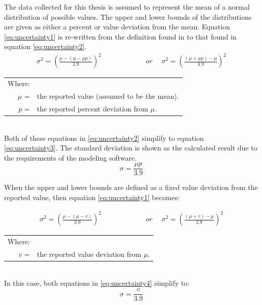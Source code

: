 \begin{linenumbers}
The data collected for this thesis is assumed to represent the mean of a normal distribution of possible values.  The upper and lower bounds of the distributions are given as either a percent or value deviation from the mean.  Equation \ref{eq:uncertainty1} is re-written from the definition found in \textcite{harmel2007} to that found in equation \ref{eq:uncertainty2}.
\begin{align}
	\sigma^2 = \left( \frac{\mu - (\mu - \mu p)}{3.9} \right)^2  &  \phantom{wordsssssss} or \phantom{s}  & 	\sigma^2 = \left( \frac{(\mu + \mu p) - \mu}{3.9} \right)^2 \label{eq:uncertainty2}
\end{align}

\begin{tabular}{r p{5.5in}}
	Where:\\
	$ \mu $ = & the reported value (assumed to be the mean).\\
	$ p $ = & the reported percent deviation from $ \mu $.\\
\end{tabular}\\

Both of these equations in \ref{eq:uncertainty2} simplify to equation \ref{eq:uncertainty3}.  The standard deviation is shown as the calculated result due to the requirements of the modeling software.
\begin{equation}
\sigma = \frac{\mu p}{3.9}
\label{eq:uncertainty3}
\end{equation}

When the upper and lower bounds are defined as a fixed value deviation from the reported value, then equation \ref{eq:uncertainty1} becomes:

\begin{align}
	\sigma^2 = \left( \frac{\mu - (\mu - v)}{3.9} \right)^2  &  \phantom{wordsssssss} or \phantom{s}  & 	\sigma^2 = \left( \frac{(\mu + v) - \mu}{3.9} \right)^2 \label{eq:uncertainty4}
\end{align}
\begin{tabular}{r p{5.5in}}
	Where:\\
	$ v $ = & the reported value deviation from $ \mu $.\\
\end{tabular}\\

In this case, both equations in \ref{eq:uncertainty4} simplify to:
\begin{equation}
\sigma = \frac{v}{3.9}
\label{eq:uncertainty5}
\end{equation}


\end{linenumbers}
